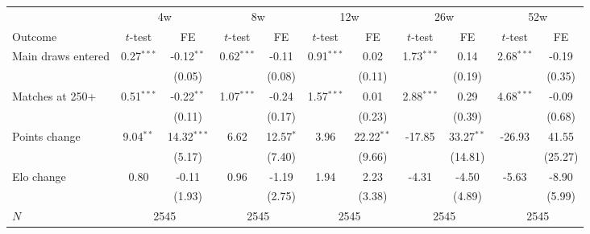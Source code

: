 \begin{tabular}{l cc cc cc cc cc}
\toprule
 & \multicolumn{2}{c}{4w} & \multicolumn{2}{c}{8w} & \multicolumn{2}{c}{12w} & \multicolumn{2}{c}{26w} & \multicolumn{2}{c}{52w} \\
\cmidrule(lr){2-3} \cmidrule(lr){4-5} \cmidrule(lr){6-7} \cmidrule(lr){8-9} \cmidrule(lr){10-11}
Outcome & $t$-test & FE & $t$-test & FE & $t$-test & FE & $t$-test & FE & $t$-test & FE \\
\midrule
Main draws entered & 0.27$^{***}$ & -0.12$^{**}$ & 0.62$^{***}$ & -0.11 & 0.91$^{***}$ & 0.02 & 1.73$^{***}$ & 0.14 & 2.68$^{***}$ & -0.19 \\
 & & (0.05) & & (0.08) & & (0.11) & & (0.19) & & (0.35) \\
\addlinespace
Matches at 250+ & 0.51$^{***}$ & -0.22$^{**}$ & 1.07$^{***}$ & -0.24 & 1.57$^{***}$ & 0.01 & 2.88$^{***}$ & 0.29 & 4.68$^{***}$ & -0.09 \\
 & & (0.11) & & (0.17) & & (0.23) & & (0.39) & & (0.68) \\
\addlinespace
Points change & 9.04$^{**}$ & 14.32$^{***}$ & 6.62 & 12.57$^{*}$ & 3.96 & 22.22$^{**}$ & -17.85 & 33.27$^{**}$ & -26.93 & 41.55 \\
 & & (5.17) & & (7.40) & & (9.66) & & (14.81) & & (25.27) \\
\addlinespace
Elo change & 0.80 & -0.11 & 0.96 & -1.19 & 1.94 & 2.23 & -4.31 & -4.50 & -5.63 & -8.90 \\
 & & (1.93) & & (2.75) & & (3.38) & & (4.89) & & (5.99) \\
\addlinespace
$N$ & \multicolumn{2}{c}{2545} & \multicolumn{2}{c}{2545} & \multicolumn{2}{c}{2545} & \multicolumn{2}{c}{2545} & \multicolumn{2}{c}{2545} \\
\bottomrule
\end{tabular}
